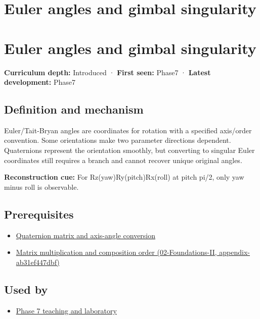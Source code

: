 \hypertarget{appendix-5f723fbd0593}{}
\section*{Euler angles and gimbal singularity}
\section{Euler angles and gimbal singularity}\label{appendix-5f723fbd0593-euler-angles-and-gimbal-singularity}

\textbf{Curriculum depth:} Introduced · \textbf{First seen:} Phase7 · \textbf{Latest development:} Phase7

\subsection{Definition and mechanism}\label{appendix-5f723fbd0593-definition-and-mechanism}

Euler/Tait-Bryan angles are coordinates for rotation with a specified axis/order convention. Some orientations make two parameter directions dependent. Quaternions represent the orientation smoothly, but converting to singular Euler coordinates still requires a branch and cannot recover unique original angles.

\textbf{Reconstruction cue:} For Rz(yaw)Ry(pitch)Rx(roll) at pitch pi/2, only yaw minus roll is observable.

\subsection{Prerequisites}\label{appendix-5f723fbd0593-prerequisites}

\begin{itemize}
\tightlist
\item
  \hyperref[appendix-26d8da71f6c4]{Quaternion matrix and axis-angle conversion}
\item
  \href{../02-Foundations-II/main.pdf\#nameddest=appendix-ab31ef447dbf}{Matrix multiplication and composition order (02-Foundations-II, appendix-ab31ef447dbf)}
\end{itemize}

\subsection{Used by}\label{appendix-5f723fbd0593-used-by}

\begin{itemize}
\tightlist
\item
  \hyperref[01-foundations-i-ch018-keep-the-promises-visible-while-moving-between-representations]{Phase 7 teaching and laboratory}
\end{itemize}

